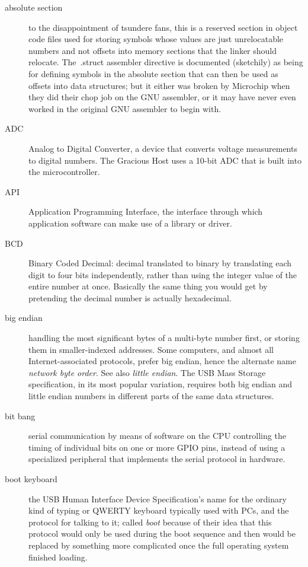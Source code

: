 \begin{description}

\item[absolute section] to the disappointment of tsundere fans, this is a
reserved section in object code files used for storing symbols whose values
are just unrelocatable numbers and not offsets into memory sections that the
linker should relocate.  The\ .struct assembler directive is documented
(sketchily) as being for defining symbols in the absolute section that can
then be used as offsets into data structures; but it either was broken by
Microchip when they did their chop job on the GNU assembler, or it may have
never even worked in the original GNU assembler to begin with.

\item[ADC] Analog to Digital Converter, a device that converts voltage
measurements to digital numbers.  The Gracious Host uses a 10-bit ADC that
is built into the microcontroller.

\item[API] Application Programming Interface, the interface through which
application software can make use of a library or driver.

\item[BCD] Binary Coded Decimal:  decimal translated to binary by
translating each digit to four bits independently, rather than using the
integer value of the entire number at once.  Basically the same
thing you would get by pretending the decimal number is actually hexadecimal.

\item[big endian] handling the most significant bytes of a multi-byte number
first, or storing them in smaller-indexed addresses.  Some computers, and
almost all Internet-associated protocols, prefer big endian, hence the
alternate name \emph{network byte order}.  See also \emph{little endian}. 
The USB Mass Storage specification, in its most popular variation, requires
both big endian and little endian numbers in different parts of the same data
structures.

\item[bit bang] serial communication by means of software on the CPU
controlling the timing of individual bits on one or more GPIO pins, instead
of using a specialized peripheral that implements the serial protocol in
hardware.

\item[boot keyboard] the USB Human Interface Device Specification's name for
the ordinary kind of typing or QWERTY keyboard typically used with PCs, and
the protocol for talking to it; called \emph{boot} because of their idea
that this protocol would only be used during the boot sequence and then
would be replaced by something more complicated once the full operating
system finished loading.


\end{description}
